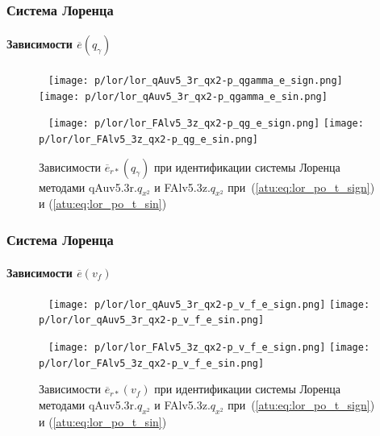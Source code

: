 \documentclass[10pt,utf8]{beamer}
\begin{document}

\begin{frame}
  \frametitle{Система Лоренца}
  \framesubtitle{Зависимости $\overline{e}(q_\gamma)$}

  \begin{figure}[h!]
    \centerline{
      {~}\hfill
      \texttt{[image: p/lor/lor\_qAuv5\_3r\_qx2-p\_qgamma\_e\_sign.png]}
      \hfill
      \texttt{[image: p/lor/lor\_qAuv5\_3r\_qx2-p\_qgamma\_e\_sin.png]}
      \hfill{~}
    }
    \centerline{
      {~}\hfill
      \texttt{[image: p/lor/lor\_FAlv5\_3z\_qx2-p\_qg\_e\_sign.png]}
      \hfill
      \texttt{[image: p/lor/lor\_FAlv5\_3z\_qx2-p\_qg\_e\_sin.png]}
      \hfill{~}
    }
    \caption{Зависимости $\overline{e}_{r*}(q_\gamma)$
     при идентификации системы Лоренца методами qAuv5.3r.$q_{x^2}$ и FAlv5.3z.$q_{x^2}$
     при~(\ref{atu:eq:lor_po_t_sign}) и (\ref{atu:eq:lor_po_t_sin})}
    \label{atu:f:lor_qgamma_Fq.q_x2}
  \end{figure}



\end{frame}


\begin{frame}
  \frametitle{Система Лоренца}
  \framesubtitle{Зависимости $\overline{e}(v_f)$}


  \begin{figure}[h!]
    \centerline{
      {~}\hfill
      \texttt{[image: p/lor/lor\_qAuv5\_3r\_qx2-p\_v\_f\_e\_sign.png]}
      \hfill
      \texttt{[image: p/lor/lor\_qAuv5\_3r\_qx2-p\_v\_f\_e\_sin.png]}
      \hfill{~}
    }
    \centerline{
      {~}\hfill
      \texttt{[image: p/lor/lor\_FAlv5\_3z\_qx2-p\_v\_f\_e\_sign.png]}
      \hfill
      \texttt{[image: p/lor/lor\_FAlv5\_3z\_qx2-p\_v\_f\_e\_sin.png]}
      \hfill{~}
    }
    \caption{Зависимости $\overline{e}_{r*}(v_f)$
     при идентификации системы Лоренца методами qAuv5.3r.$q_{x^2}$ и FAlv5.3z.$q_{x^2}$
     при~(\ref{atu:eq:lor_po_t_sign}) и (\ref{atu:eq:lor_po_t_sin})}
    \label{atu:f:lor_vf_Fq.q_x2}
  \end{figure}


\end{frame}


\end{document}
